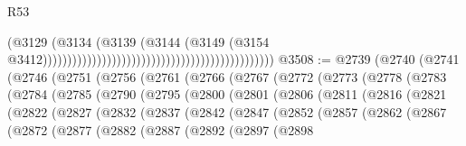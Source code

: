 \begin{lexlean}{R53}
\begin{coremodule}
                                                                                      (@3129
                                                                                        (@3134
                                                                                          (@3139
                                                                                            (@3144
                                                                                              (@3149
                                                                                                (@3154
                                                                                                  @3412)))))))))))))))))))))))))))))))))))))))))))))))
@3508 := @2739
    (@2740
      (@2741
        (@2746
          (@2751
            (@2756
              (@2761
                (@2766
                  (@2767
                    (@2772
                      (@2773
                        (@2778
                          (@2783
                            (@2784
                              (@2785
                                (@2790
                                  (@2795
                                    (@2800
                                      (@2801
                                        (@2806
                                          (@2811
                                            (@2816
                                              (@2821
                                                (@2822
                                                  (@2827
                                                    (@2832
                                                      (@2837
                                                        (@2842
                                                          (@2847
                                                            (@2852
                                                              (@2857
                                                                (@2862
                                                                  (@2867
                                                                    (@2872
                                                                      (@2877
                                                                        (@2882
                                                                          (@2887
                                                                            (@2892
                                                                              (@2897
                                                                                (@2898

\end{coremodule}
\end{lexlean}

